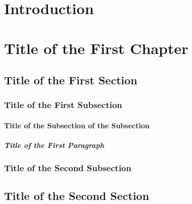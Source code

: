 \documentclass[a4paper,12pt,twoside]{report}
\begin{document}
\newpage

\listoffigures  %


\thispagestyle{empty}

\newpage
\thispagestyle{empty}
\listoftables   %
\thispagestyle{empty}

\printglossary[type=\acronymtype]

\thispagestyle{empty}

\newpage

\chapter*{Introduction}
\thispagestyle{plain}

\chapter{Title of the First Chapter}
\thispagestyle{empty}

\section{Title of the First Section}

\subsection{Title of the First Subsection}

\subsubsection{Title of the Subsection of the Subsection}

\paragraph{Title of the First Paragraph}\par

\subsection{Title of the Second Subsection}

\section{Title of the Second Section}
\end{document}
